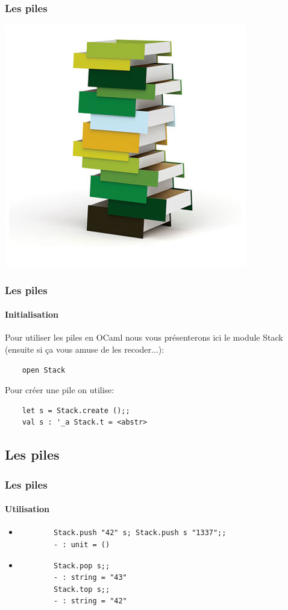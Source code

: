 \begin{frame}
	\frametitle{Les piles}
	\includegraphics[scale=0.4]{pics/stack.jpg}
\end{frame}

\begin{frame}[fragile]
	\frametitle{Les piles}
	\framesubtitle{Initialisation}
	Pour utiliser les piles en OCaml nous vous présenterons ici le module Stack (ensuite si ça vous amuse de les recoder...):
	\begin{lstlisting}
	open Stack
	\end{lstlisting}
	Pour créer une pile on utilise:
	\begin{lstlisting}
	let s = Stack.create ();;
	val s : '_a Stack.t = <abstr>
	\end{lstlisting}
\end{frame}

\subsection{Les piles}
\begin{frame}[fragile]
\frametitle{Les piles}
\framesubtitle{Utilisation}
	\begin{itemize}
	
	\item
		\begin{lstlisting}
		Stack.push "42" s; Stack.push s "1337";;
		- : unit = ()	
		\end{lstlisting}	
	
	\item
		\begin{lstlisting}
		Stack.pop s;;
		- : string = "43"
		Stack.top s;;
		- : string = "42"
		\end{lstlisting}	

	\end{itemize}

\end{frame}

